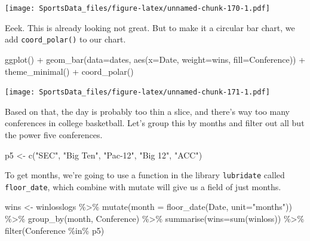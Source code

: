 \documentclass[
]{book}
\newenvironment{Shaded}{\begin{snugshade}}{\end{snugshade}}
\newcommand{\AttributeTok}[1]{\textcolor[rgb]{0.77,0.63,0.00}{#1}}
\newcommand{\FunctionTok}[1]{\textcolor[rgb]{0.00,0.00,0.00}{#1}}
\newcommand{\NormalTok}[1]{#1}
\newcommand{\OtherTok}[1]{\textcolor[rgb]{0.56,0.35,0.01}{#1}}
\newcommand{\SpecialCharTok}[1]{\textcolor[rgb]{0.00,0.00,0.00}{#1}}
\newcommand{\StringTok}[1]{\textcolor[rgb]{0.31,0.60,0.02}{#1}}
\begin{document}
\texttt{[image: SportsData\_files/figure-latex/unnamed-chunk-170-1.pdf]}

Eeek. This is already looking not great. But to make it a circular bar chart, we add \texttt{coord\_polar()} to our chart.

\begin{Shaded}
\begin{Highlighting}[]
\FunctionTok{ggplot}\NormalTok{() }\SpecialCharTok{+} \FunctionTok{geom\_bar}\NormalTok{(}\AttributeTok{data=}\NormalTok{dates, }\FunctionTok{aes}\NormalTok{(}\AttributeTok{x=}\NormalTok{Date, }\AttributeTok{weight=}\NormalTok{wins, }\AttributeTok{fill=}\NormalTok{Conference)) }\SpecialCharTok{+} \FunctionTok{theme\_minimal}\NormalTok{() }\SpecialCharTok{+} \FunctionTok{coord\_polar}\NormalTok{()}
\end{Highlighting}
\end{Shaded}

\texttt{[image: SportsData\_files/figure-latex/unnamed-chunk-171-1.pdf]}

Based on that, the day is probably too thin a slice, and there's way too many conferences in college basketball. Let's group this by months and filter out all but the power five conferences.

\begin{Shaded}
\begin{Highlighting}[]
\NormalTok{p5 }\OtherTok{\textless{}{-}} \FunctionTok{c}\NormalTok{(}\StringTok{"SEC"}\NormalTok{, }\StringTok{"Big Ten"}\NormalTok{, }\StringTok{"Pac{-}12"}\NormalTok{, }\StringTok{"Big 12"}\NormalTok{, }\StringTok{"ACC"}\NormalTok{)}
\end{Highlighting}
\end{Shaded}

To get months, we're going to use a function in the library \texttt{lubridate} called \texttt{floor\_date}, which combine with mutate will give us a field of just months.

\begin{Shaded}
\begin{Highlighting}[]
\NormalTok{wins }\OtherTok{\textless{}{-}}\NormalTok{ winlosslogs }\SpecialCharTok{\%\textgreater{}\%} \FunctionTok{mutate}\NormalTok{(}\AttributeTok{month =} \FunctionTok{floor\_date}\NormalTok{(Date, }\AttributeTok{unit=}\StringTok{"months"}\NormalTok{)) }\SpecialCharTok{\%\textgreater{}\%} \FunctionTok{group\_by}\NormalTok{(month, Conference) }\SpecialCharTok{\%\textgreater{}\%} \FunctionTok{summarise}\NormalTok{(}\AttributeTok{wins=}\FunctionTok{sum}\NormalTok{(winloss)) }\SpecialCharTok{\%\textgreater{}\%} \FunctionTok{filter}\NormalTok{(Conference }\SpecialCharTok{\%in\%}\NormalTok{ p5) }
\end{Highlighting}
\end{Shaded}
\end{document}
